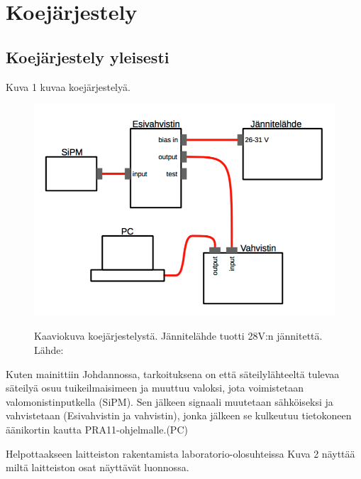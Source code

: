 \documentclass[a4paper, 12pt]{article}
\begin{document}
\section{Koejärjestely}
\subsection{Koejärjestely yleisesti}
Kuva 1 kuvaa koejärjestelyä. 

\begin{figure}[!hbt]
\includegraphics[scale=0.7]{Koejarjestely}
\label{fig:Koejarjestely}
\caption{Kaaviokuva koejärjestelystä. Jännitelähde tuotti 28V:n jännitettä. Lähde: \cite{TyoMoniste}}
\end{figure}

Kuten mainittiin Johdannossa, tarkoituksena on että säteilylähteeltä tulevaa säteilyä osuu tuikeilmaisimeen ja muuttuu valoksi, jota voimistetaan valomonistinputkella (SiPM). Sen jälkeen signaali muutetaan sähköiseksi ja vahvistetaan (Esivahvistin ja vahvistin), jonka jälkeen se kulkeutuu tietokoneen äänikortin kautta PRA11-ohjelmalle.(PC)

Helpottaakseen laitteiston rakentamista laboratorio-olosuhteissa Kuva 2 näyttää miltä laitteiston osat näyttävät luonnossa.
\end{document}
